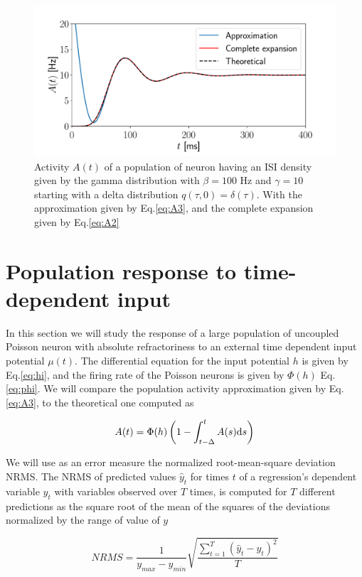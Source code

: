 \documentclass[a4paper,11pt,twoside]{article}
\def \dd  {{\rm d}}
\numberwithin{equation}{section}
\begin{document}
\begin{figure}[h!]
	\centering
	\includegraphics[width=0.8\linewidth]{delta_gamma.pdf}
	\caption{Activity $A(t)$ of a population of neuron having an ISI density given by the gamma distribution with $\beta=100$ Hz and $\gamma=10$ starting with a delta distribution $q(\tau,0)=\delta(\tau)$. With the approximation given by Eq.\eqref{eq:A3}, and the complete expansion given by Eq.\ref{eq:A2}}
	\label{fig:delta_gamma}
\end{figure}




\section{Population response to time-dependent input}
In this section we will study the response of a large population of uncoupled Poisson neuron with absolute refractoriness to an external time dependent input potential $\mu(t)$. The differential equation for the input potential $h$ is given by Eq.\eqref{eq:hi}, and the firing rate of the Poisson neurons is given by $\Phi(h)$ Eq.\eqref{eq:phi}. We will compare the population activity approximation given by Eq.\eqref{eq:A3}, to the theoretical one computed as

\begin{equation}
A(t)=\Phi(h)\left(1-\int_{t-\Delta}^t A(s)\dd s\right)
\end{equation}

We will use as an error measure the normalized root-mean-square deviation NRMS.
The NRMS of predicted values $\hat {y}_t$ for times $t$ of a regression's dependent variable $y_t$ with variables observed over $T$ times, is computed for $T$ different predictions as the square root of the mean of the squares of the deviations normalized by the range of value of $y$

\begin{equation}
NRMS=\frac{1}{y_{max}-y_{min}}\sqrt{\frac{\sum_{t=1}^T(\hat{y}_t-y_t)^2}{T}}
\end{equation}
\end{document}
